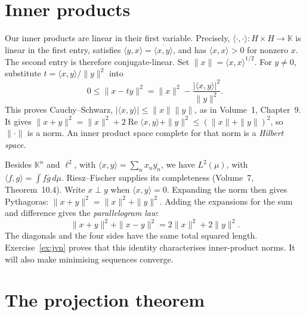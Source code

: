 \section{Inner products}

Our inner products are linear in their first variable. Precisely, $\langle\cdot,\cdot\rangle:H\times H\to\mathbb K$ is linear in the first entry, satisfies $\langle y,x\rangle=\overline{\langle x,y\rangle}$, and has $\langle x,x\rangle>0$ for nonzero $x$. The second entry is therefore conjugate-linear. Set $\|x\|=\langle x,x\rangle^{1/2}$. For $y\ne0$, substitute $t=\langle x,y\rangle/\|y\|^2$ into
\[0\le\|x-ty\|^2=\|x\|^2-\frac{|\langle x,y\rangle|^2}{\|y\|^2}.\]
This proves Cauchy--Schwarz, $|\langle x,y\rangle|\le\|x\|\|y\|$, as in Volume~1, Chapter~9. It gives $\|x+y\|^2=\|x\|^2+2\operatorname{Re}\langle x,y\rangle+\|y\|^2\le(\|x\|+\|y\|)^2$, so $\|\cdot\|$ is a norm. An inner product space complete for that norm is a \emph{Hilbert space}.


Besides $\mathbb K^n$ and $\ell^2$, with $\langle x,y\rangle=\sum_nx_n\overline{y_n}$, we have $L^2(\mu)$, with $\langle f,g\rangle=\int f\overline g\,d\mu$. Riesz--Fischer supplies its completeness (Volume~7, Theorem~10.4). Write $x\perp y$ when $\langle x,y\rangle=0$. Expanding the norm then gives Pythagoras: $\|x+y\|^2=\|x\|^2+\|y\|^2$. Adding the expansions for the sum and difference gives the \emph{parallelogram law}:
\[\|x+y\|^2+\|x-y\|^2=2\|x\|^2+2\|y\|^2.\]
The diagonals and the four sides have the same total squared length. Exercise~\ref{ex:jvn} proves that this identity characterises inner-product norms. It will also make minimising sequences converge.

\section{The projection theorem}

